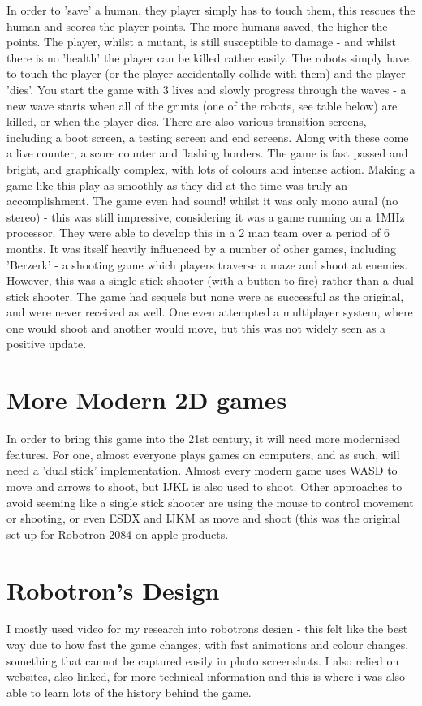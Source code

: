 In order to 'save' a human, they player simply has to touch them, this rescues the human and scores the player points. The more humans saved, the higher the points. The player, whilst a mutant, is still susceptible to damage - and whilst there is no 'health' the player can be killed rather easily. The robots simply have to touch the player (or the player accidentally collide with them) and the player 'dies'. You start the game with 3 lives and slowly progress through the waves - a new wave starts when all of the grunts (one of the robots, see table below) are killed, or when the player dies. 
There are also various transition screens, including a boot screen, a testing screen and end screens. Along with these come a live counter, a score counter and flashing borders. The game is fast passed and bright, and graphically complex, with lots of colours and intense action. Making a game like this play as smoothly as they did at the time was truly an accomplishment.
The game even had sound! whilst it was only mono aural (no stereo) - this was still impressive, considering it was a game running on a 1MHz processor. They were able to develop this in a 2 man team over a period of 6 months. It was itself heavily influenced by a number of other games, including 'Berzerk' - a shooting game which players traverse a maze and shoot at enemies. However, this was a single stick shooter (with a button to fire) rather than a dual stick shooter.
The game had sequels but none were as successful as the original, and were never received as well. One even attempted a multiplayer system, where one would shoot and another would move, but this was not widely seen as a positive update.

\section{More Modern 2D games}
In order to bring this game into the 21st century, it will need more modernised features. For one, almost everyone plays games on computers, and as such, will need a 'dual stick' implementation. Almost every modern game uses WASD to move and arrows to shoot, but IJKL is also used to shoot. Other approaches to avoid seeming like a single stick shooter are using the mouse to control movement or shooting, or even ESDX and IJKM as move and shoot (this was the original set up for Robotron 2084 on apple products. 

\section{Robotron's Design}
I mostly used video for my research into robotrons design - this felt like the best way due to how fast the game changes, with fast animations and colour changes, something that cannot be captured easily in photo screenshots. I also relied on websites, also linked, for more technical information and this is where i was also able to learn lots of the history behind the game.



